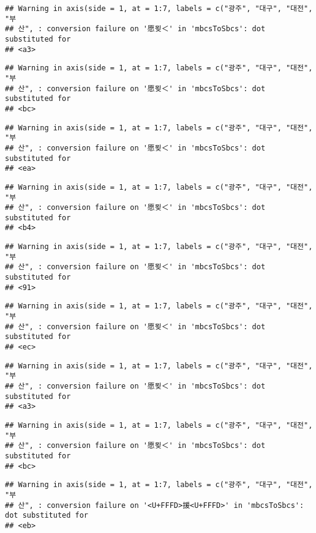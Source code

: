 \documentclass[]{article}
\begin{document}
\begin{verbatim}
## Warning in axis(side = 1, at = 1:7, labels = c("광주", "대구", "대전", "부
## 산", : conversion failure on '愿묒＜' in 'mbcsToSbcs': dot substituted for
## <a3>
\end{verbatim}

\begin{verbatim}
## Warning in axis(side = 1, at = 1:7, labels = c("광주", "대구", "대전", "부
## 산", : conversion failure on '愿묒＜' in 'mbcsToSbcs': dot substituted for
## <bc>
\end{verbatim}

\begin{verbatim}
## Warning in axis(side = 1, at = 1:7, labels = c("광주", "대구", "대전", "부
## 산", : conversion failure on '愿묒＜' in 'mbcsToSbcs': dot substituted for
## <ea>
\end{verbatim}

\begin{verbatim}
## Warning in axis(side = 1, at = 1:7, labels = c("광주", "대구", "대전", "부
## 산", : conversion failure on '愿묒＜' in 'mbcsToSbcs': dot substituted for
## <b4>
\end{verbatim}

\begin{verbatim}
## Warning in axis(side = 1, at = 1:7, labels = c("광주", "대구", "대전", "부
## 산", : conversion failure on '愿묒＜' in 'mbcsToSbcs': dot substituted for
## <91>
\end{verbatim}

\begin{verbatim}
## Warning in axis(side = 1, at = 1:7, labels = c("광주", "대구", "대전", "부
## 산", : conversion failure on '愿묒＜' in 'mbcsToSbcs': dot substituted for
## <ec>
\end{verbatim}

\begin{verbatim}
## Warning in axis(side = 1, at = 1:7, labels = c("광주", "대구", "대전", "부
## 산", : conversion failure on '愿묒＜' in 'mbcsToSbcs': dot substituted for
## <a3>
\end{verbatim}

\begin{verbatim}
## Warning in axis(side = 1, at = 1:7, labels = c("광주", "대구", "대전", "부
## 산", : conversion failure on '愿묒＜' in 'mbcsToSbcs': dot substituted for
## <bc>
\end{verbatim}

\begin{verbatim}
## Warning in axis(side = 1, at = 1:7, labels = c("광주", "대구", "대전", "부
## 산", : conversion failure on '<U+FFFD>援<U+FFFD>' in 'mbcsToSbcs': dot substituted for
## <eb>
\end{verbatim}
\end{document}
